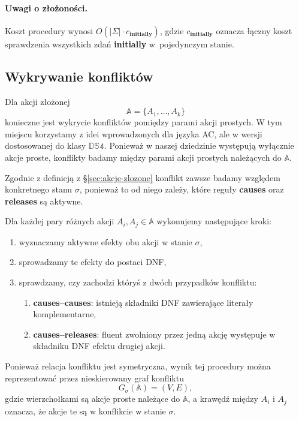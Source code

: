 \documentclass[11pt,a4paper]{article}
\newcommand{\initially}{\textbf{initially}}
\theoremstyle{definition}
\begin{document}
\paragraph{Uwagi o złożoności.}
Koszt procedury wynosi $O(|\Sigma| \cdot c_{\textbf{initially}})$, gdzie $c_{\textbf{initially}}$ oznacza łączny koszt sprawdzenia wszystkich zdań \initially{} w~pojedynczym stanie.

\subsection{Wykrywanie konfliktów}
\label{sec:alg-konflikty}

Dla akcji złożonej
\[
\mathbb{A} = \{A_1,\ldots,A_k\}
\]
konieczne jest wykrycie konfliktów pomiędzy parami akcji prostych. W tym miejscu korzystamy z idei wprowadzonych dla języka AC, ale w wersji dostosowanej do klasy $\mathbb{DS4}$. Ponieważ w naszej dziedzinie występują wyłącznie akcje proste, konflikty badamy między parami akcji prostych należących do $\mathbb{A}$.

Zgodnie z definicją z §\ref{sec:akcje-zlozone} konflikt zawsze badamy względem konkretnego stanu $\sigma$, ponieważ to od niego zależy, które reguły \textbf{causes} oraz \textbf{releases} są aktywne.

Dla każdej pary różnych akcji $A_i, A_j \in \mathbb{A}$ wykonujemy następujące kroki:
\begin{enumerate}
    \item wyznaczamy aktywne efekty obu akcji w stanie $\sigma$,
    \item sprowadzamy te efekty do postaci DNF,
    \item sprawdzamy, czy zachodzi któryś z dwóch przypadków konfliktu:
    \begin{enumerate}
        \item \textbf{causes--causes}: istnieją składniki DNF zawierające literały komplementarne,
        \item \textbf{causes--releases}: fluent zwolniony przez jedną akcję występuje w składniku DNF efektu drugiej akcji.
    \end{enumerate}
\end{enumerate}

Ponieważ relacja konfliktu jest symetryczna, wynik tej procedury można reprezentować przez nieskierowany graf konfliktu
\[
G_{\sigma}(\mathbb{A}) = (V,E),
\]
gdzie wierzchołkami są akcje proste należące do $\mathbb{A}$, a krawędź między $A_i$ i $A_j$ oznacza, że akcje te są w konflikcie w stanie $\sigma$.
\end{document}
